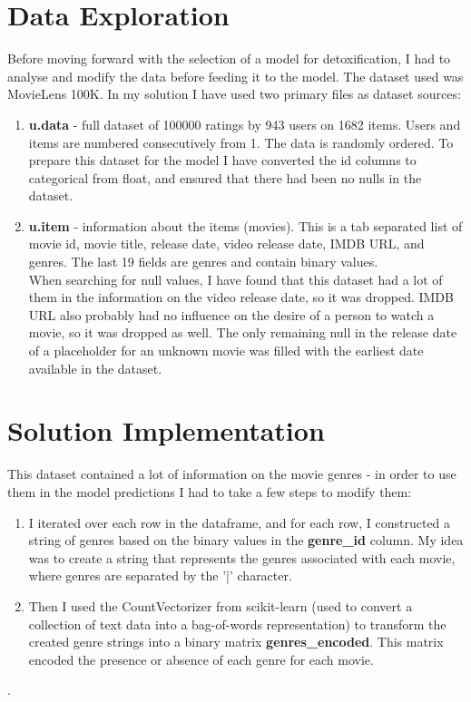 \documentclass[]{article}
\begin{document}
	\section{Data Exploration}
	Before moving forward with the selection of a model for detoxification, I had to analyse and modify the data before feeding it to the model. The dataset used was MovieLens 100K. In my solution I have used two primary files as dataset sources:
	\begin{enumerate}
		\item \textbf{u.data} - full dataset of 100000 ratings by 943 users on 1682 items. Users and items are numbered consecutively from 1. The data is randomly ordered. To prepare this dataset for the model I have converted the id columns to categorical from float, and ensured that there had been no nulls in the dataset.
		\item \textbf{u.item} - information about the items (movies). This is a tab separated list of movie id, movie title, release date, video release date, IMDB URL, and genres. The last 19 fields are genres and contain binary values. \\
		When searching for null values, I have found that this dataset had a lot of them in the information on the video release date, so it was dropped. IMDB URL also probably had no influence on the desire of a person to watch a movie, so it was dropped as well. The only remaining null in the release date of a placeholder for an unknown movie was filled with the earliest date available in the dataset. \\
	\end{enumerate}
	
	\section{Solution Implementation}
	This dataset contained a lot of information on the movie genres - in order to use them in the model predictions I had to take a few steps to modify them: 
	\begin{enumerate}
		\item I iterated over each row in the dataframe, and for each row, I constructed a string of genres based on the binary values in the \textbf{genre\_id} column. My idea was to create a string that represents the genres associated with each movie, where genres are separated by the '|' character.
		\item Then I used the CountVectorizer from scikit-learn (used to convert a collection of text data into a bag-of-words representation) to transform the created genre strings into a binary matrix \textbf{genres\_encoded}. This matrix encoded the presence or absence of each genre for each movie.
	\end{enumerate}.
	
\end{document}
